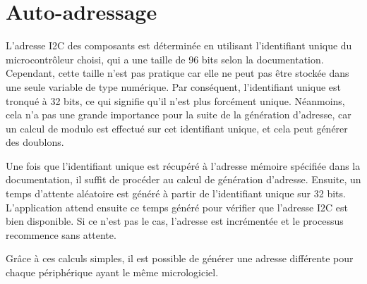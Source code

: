 \section{Auto-adressage}

L'adresse I2C des composants est déterminée en utilisant l'identifiant unique du microcontrôleur choisi, qui a une taille de 96 bits selon la documentation.
Cependant, cette taille n'est pas pratique car elle ne peut pas être stockée dans une seule variable de type numérique.
Par conséquent, l'identifiant unique est tronqué à 32 bits, ce qui signifie qu'il n'est plus forcément unique.
Néanmoins, cela n'a pas une grande importance pour la suite de la génération d'adresse, car un calcul de modulo est effectué sur cet identifiant unique, et cela peut générer des doublons.

Une fois que l'identifiant unique est récupéré à l'adresse mémoire spécifiée dans la documentation, il suffit de procéder au calcul de génération d'adresse.
Ensuite, un temps d'attente aléatoire est généré à partir de l'identifiant unique sur 32 bits.
L'application attend ensuite ce temps généré pour vérifier que l'adresse I2C est bien disponible.
Si ce n'est pas le cas, l'adresse est incrémentée et le processus recommence sans attente.

Grâce à ces calculs simples, il est possible de générer une adresse différente pour chaque périphérique ayant le même micrologiciel.